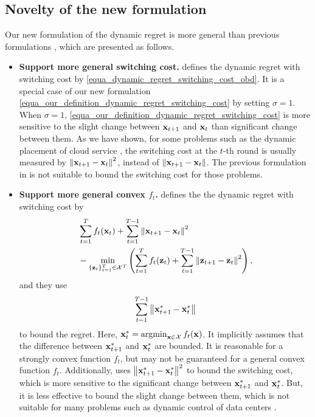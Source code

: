 \documentclass[journal]{IEEEtran}
\begin{document}
\subsection{Novelty of the new formulation}
Our new formulation of the dynamic regret is more general than previous formulations \cite{pmlr-v75-chen18b,Li:2018uy}, which are presented as follows. 
\begin{itemize}
\item \textbf{Support more general switching cost.} \cite{pmlr-v75-chen18b} defines the dynamic regret  with switching cost  by \eqref{equa_dynamic_regret_switching_cost_obd}. It is a special case of our new formulation \eqref{equa_our_definition_dynamic_regret_switching_cost} by setting $\sigma = 1$. When $\sigma=1$, \eqref{equa_our_definition_dynamic_regret_switching_cost} is more sensitive to the slight change between ${\bf x}_{t+1}$ and ${\bf x}_t$ than  significant change between them. As we have shown, for some problems such as the dynamic placement of cloud service \cite{6258025:zhang}, the switching cost at the $t$-th round is usually measured by $\left\lVert{\bf x}_{t+1} - {\bf x}_t\right\rVert^2$, instead of $\left\lVert{\bf x}_{t+1} - {\bf x}_t\right\rVert$. The previous formulation in \cite{pmlr-v75-chen18b} is not suitable to bound the switching cost for those problems. 
\item \textbf{Support more general convex $f_t$.} \cite{Li:2018uy} defines the  the dynamic regret with switching cost by 
\begin{align}
\nonumber
& \sum_{t=1}^T f_t({\bf x}_t) + \sum_{t=1}^{T-1}\left\lVert{\bf x}_{t+1} - {\bf x}_t\right\rVert^2 \\ \nonumber
&- \min_{\{{\bf z}_t\}_{t=1}^T \in {\mathcal{X}}^T} \left( \sum_{t=1}^T f_t({\bf z}_t) + \sum_{t=1}^{T-1}\left\lVert{\bf z}_{t+1} - {\bf z}_t\right\rVert^2 \right),
\end{align} and they use 
\begin{align}
\nonumber
\sum_{t=1}^{T-1} \left\lVert{\bf x}_{t+1}^\ast - {\bf x}_t^\ast\right\rVert
\end{align} to bound the regret. Here, $\x_t^\ast = \argmin_{\x\in\Xcal} f_t(\x)$.  It implicitly assumes that the difference between ${\bf x}_{t+1}^\ast$ and ${\bf x}_t^\ast$ are bounded. It is reasonable for a strongly convex function $f_t$, but may not be guaranteed for a general convex function $f_t$.  Additionally, \cite{Li:2018uy} uses $\left\lVert{\bf x}_{t+1}^\ast - {\bf x}_t^\ast\right\rVert^2$ to bound the switching cost, which is more sensitive to the significant change between ${\bf x}_{t+1}^\ast$ and ${\bf x}_t^\ast$. But, it is  less effective to bound the slight change between them, which is not suitable for many problems such as dynamic control of data centers \cite{Lin:2012:OOS}.  
\end{itemize}
\end{document}
